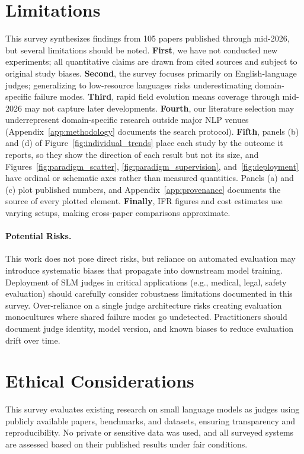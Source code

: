\documentclass[11pt]{article}
\begin{document}
\section*{Limitations}

This survey synthesizes findings from 105 papers published through mid-2026, but several limitations should be noted. \textbf{First}, we have not conducted new experiments; all quantitative claims are drawn from cited sources and subject to original study biases. \textbf{Second}, the survey focuses primarily on English-language judges; generalizing to low-resource languages risks underestimating domain-specific failure modes. \textbf{Third}, rapid field evolution means coverage through mid-2026 may not capture later developments. \textbf{Fourth}, our literature selection may underrepresent domain-specific research outside major NLP venues (Appendix~\ref{app:methodology} documents the search protocol). \textbf{Fifth}, panels (b) and (d) of Figure~\ref{fig:individual_trends} place each study by the outcome it reports, so they show the direction of each result but not its size, and Figures~\ref{fig:paradigm_scatter}, \ref{fig:paradigm_supervision}, and~\ref{fig:deployment} have ordinal or schematic axes rather than measured quantities. Panels (a) and (c) plot published numbers, and Appendix~\ref{app:provenance} documents the source of every plotted element. \textbf{Finally}, IFR figures and cost estimates use varying setups, making cross-paper comparisons approximate.

\paragraph{Potential Risks.} This work does not pose direct risks, but reliance on automated evaluation may introduce systematic biases that propagate into downstream model training. Deployment of SLM judges in critical applications (e.g., medical, legal, safety evaluation) should carefully consider robustness limitations documented in this survey. Over-reliance on a single judge architecture risks creating evaluation monocultures where shared failure modes go undetected. Practitioners should document judge identity, model version, and known biases to reduce evaluation drift over time.

\section*{Ethical Considerations}

This survey evaluates existing research on small language models as judges using publicly available papers, benchmarks, and datasets, ensuring transparency and reproducibility. No private or sensitive data was used, and all surveyed systems are assessed based on their published results under fair conditions.
\end{document}

